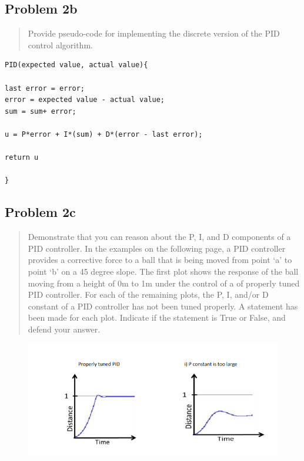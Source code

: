\documentclass[10pt,a4paper]{article}
\let\oldsubsection\subsection
\renewcommand{\subsection}{%
    \setcounter{equation}{0}%
    \oldsubsection%
}
\begin{document}
\subsection{Problem 2b}\begin{quote}
Provide pseudo-code for implementing the discrete version of the PID control algorithm.
\end{quote}

\begin{lstlisting}
PID(expected value, actual value){

last error = error;
error = expected value - actual value;
sum = sum+ error; 

u = P*error + I*(sum) + D*(error - last error);

return u

}
\end{lstlisting}


\subsection{Problem 2c}\begin{quote}
Demonstrate that you can reason about the P, I, and D components of a PID controller. In the examples
on the following page, a PID controller provides a corrective force to a ball that is being moved from
point ‘a’ to point ‘b’ on a 45 degree slope. The first plot shows the response of the ball moving from a
height of 0m to 1m under the control of a of properly tuned PID controller. For each of the remaining
plots, the P, I, and/or D constant of a PID controller has not been tuned properly. A statement has been
made for each plot. Indicate if the statement is True or False, and defend your answer.
\end{quote}


\begin{figure}[H]
\centering
\includegraphics[width=5in]{images/Problem2-1.png} \\
\end{figure}
\end{document}
